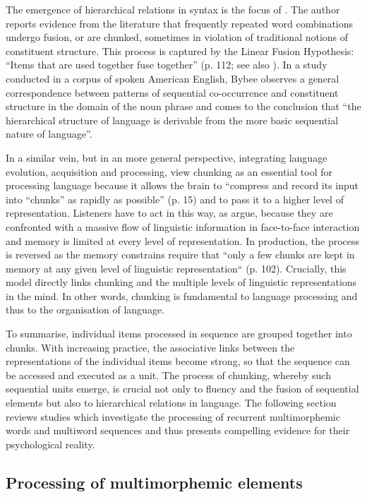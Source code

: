 The emergence of hierarchical relations in syntax is the focus of \citet{bybee-constituency-2002}. The author reports evidence from the literature that frequently repeated word combinations undergo fusion, or are chunked, sometimes in violation of traditional notions of constituent structure. This process is captured by the Linear Fusion Hypothesis: ``Items that are used together fuse together'' (p. 112; see also \citealt{bybee-scheibman}). In a study conducted in a corpus of spoken American English, Bybee observes a general correspondence between patterns of sequential co-occurrence and constituent structure in the domain of the noun phrase and comes to the conclusion that ``the hierarchical structure of language is derivable from the more basic sequential nature of language''. 

In a similar vein, but in an more general perspective, integrating language evolution, acquisition and processing, \citet[]{christiansen-chater-2016} view chunking as an essential tool for processing language because it allows the brain to “compress and record its input into “chunks” as rapidly as possible” (p. 15) and to pass it to a higher level of representation. Listeners have to act in this way, as \citeauthor{christiansen-chater-2016} argue, because they are confronted with a massive flow of linguistic information in face-to-face interaction and memory is limited at every level of representation. In production, the process is reversed as the memory constrains require that “only a few chunks are kept in memory at any given level of linguistic representation“ (p. 102). Crucially, this model directly links chunking and the multiple levels of linguistic representations in the mind. In other words, chunking is fundamental to language processing and thus to the organisation of language.

To summarise, individual items processed in sequence are grouped together into chunks. With increasing practice, the associative links between the representations of the individual items become strong, so that the sequence can be accessed and executed as a unit. The process of chunking, whereby such sequential units emerge, is crucial not only to fluency and the fusion of sequential elements but also to hierarchical relations in language. The following section reviews studies which investigate the processing of recurrent multimorphemic words and multiword sequences and thus presents  compelling evidence for their psychological reality.  

\subsection{Processing of multimorphemic elements}
\label{processing}

